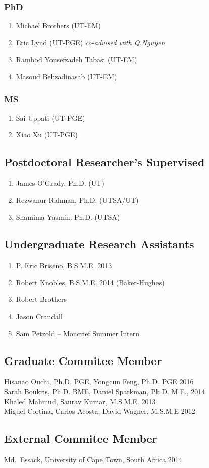 \subsubsection*{PhD}
\begin{enumerate}
    \item Michael Brothers (UT-EM)
    \item Eric Lynd (UT-PGE) \emph{co-advised with Q.Nguyen}
    \item Rambod Yousefzadeh Tabasi (UT-EM)
    \item Masoud Behzadinasab (UT-EM)
\end{enumerate}

\subsubsection*{MS}
\begin{enumerate}
    \item Sai Uppati (UT-PGE)
    \item Xiao Xu (UT-PGE)
\end{enumerate}

\subsection*{Postdoctoral Researcher's Supervised}
  \begin{enumerate}
      \item James O'Grady, Ph.D. (UT)
      \item Rezwanur Rahman, Ph.D. (UTSA/UT)
      \item Shamima Yasmin, Ph.D. (UTSA)
  \end{enumerate}

\subsection*{Undergraduate Research Assistants}
  \begin{enumerate}
    \item P. Eric Briseno, B.S.M.E. 2013
    \item Robert Knobles, B.S.M.E. 2014 (Baker-Hughes)
    \item Robert Brothers
    \item Jason Crandall
    \item Sam Petzold -- Moncrief Summer Intern
  \end{enumerate}

\subsection*{Graduate Commitee Member}
Hisanao Ouchi, Ph.D. PGE, Yongcun Feng, Ph.D. PGE 2016 \\
Sarah Boukris, Ph.D. BME, Daniel Sparkman, Ph.D. M.E., 2014 \\
Khaled Mahmud, Saurav Kumar, M.S.M.E. 2013 \\
Miguel Cortina, Carlos Acosta, David Wagner, M.S.M.E 2012 

\subsection*{External Commitee Member}
Md.~Essack, University of Cape Town, South Africa 2014

